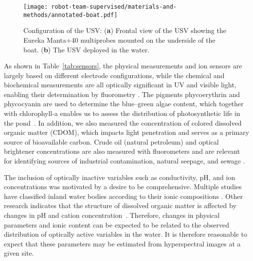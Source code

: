 \begin{figure}[H]
\hspace{-6pt}\texttt{[image: robot-team-supervised/materials-and-methods/annotated-boat.pdf]}
\caption{Configuration of the USV: (\textbf{a}) Frontal view of the USV showing the Eureka Manta+40 multiprobes mounted on the underside of the boat. (\textbf{b}) The USV deployed in the water.\label{fig:boat-components}}
\end{figure}

As shown in Table~\ref{tab:sensors}, the physical measurements and ion sensors
are largely based on different electrode configurations, while the chemical and
biochemical measurements are all optically significant in UV and visible light,
enabling their determination by fluorometry
\cite{de2007ion,trees2002fluorometric,tillman2017evaluation}. The pigments
phycoerythrin and phycocyanin are used to determine the blue--green algae
content, which together with chlorophyll-a enables us to assess the distribution
of photosynthetic life in the pond~\cite{Brient2008APP, boyer2009phytoplankton}.
In addition, we also measured the concentration of colored dissolved organic
matter (CDOM), which impacts light penetration and serves as a primary source of
bioavailable carbon. Crude oil (natural petroleum) and optical brightener
concentrations are also measured with fluorometers and are relevant for
identifying sources of industrial contamination, natural seepage, and sewage
\cite{brown2003review,cao2009evaluation}.

The inclusion of optically inactive variables such as conductivity, pH, and ion concentrations was motivated by a desire to be comprehensive. Multiple studies have classified inland water bodies according to their ionic compositions \cite{piper1944graphic, dordoni2023preliminary}. Other research indicates that the structure of dissolved organic matter is affected by changes in pH and cation concentration~\cite{pace2012ph}. Therefore, changes in physical parameters and ionic content can be expected to be related to the observed distribution of optically active variables in the water. It is therefore reasonable to expect that these parameters may be estimated from hyperspectral images at a given site.

\clearpage
\newpage

